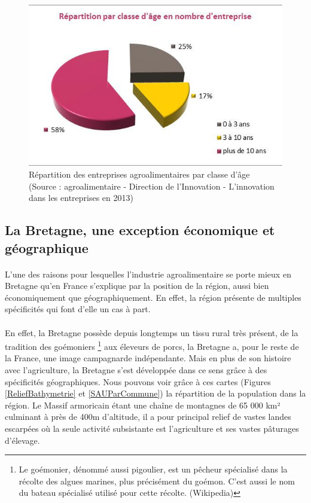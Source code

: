 \documentclass[a4paper,12pt]{report}
\begin{document}
	\begin{figure}[!h]
	\centering
	\includegraphics[scale=1]{Illustrations/RepartitionClasseAge.png}
	\caption{Répartition des entreprises agroalimentaires par classe d'âge\\(Source : agroalimentaire - Direction de l’Innovation - L’innovation dans les entreprises en 2013\cite{InnovationEntreprises2013})}
	\label{RepartitionParTaille}
	\end{figure}

		\subsection{La Bretagne, une exception économique et géographique}
			\paragraph{}L’une des raisons pour lesquelles l’industrie agroalimentaire se porte mieux en Bretagne qu’en France s’explique par la position de la région, aussi bien économiquement que géographiquement. En effet, la région présente de multiples spécificités qui font d’elle un cas à part.
			
			\paragraph{}En effet, la Bretagne possède depuis longtemps un tissu rural très présent, de la tradition des goémoniers \footnote{Le goémonier, dénommé aussi pigoulier, est un pêcheur spécialisé dans la récolte des algues marines, plus précisément du goémon. C'est aussi le nom du bateau spécialisé utilisé pour cette récolte. (Wikipedia)} aux éleveurs de porcs, la Bretagne a, pour le reste de la France, une image campagnarde indépendante. Mais en plus de son histoire avec l’agriculture, la Bretagne s’est développée dans ce sens grâce à des spécificités géographiques. Nous pouvons voir grâce à ces cartes (Figures \ref{ReliefBathymetrie} et \ref{SAUParCommune}) la répartition de la population dans la région. Le Massif armoricain étant une chaîne de montagnes de 65 000 km² culminant à près de 400m d’altitude, il a pour principal relief de vastes landes escarpées où la seule activité subsistante est l’agriculture et ses vastes pâturages d’élevage.
			
\end{document}
